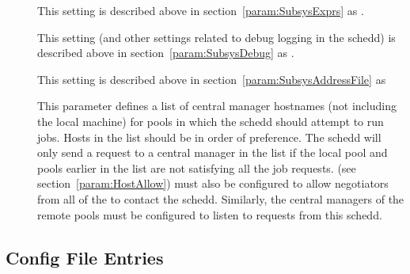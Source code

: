 \begin{description}
\item[] \label{param:ScheddExprs} This setting is
  described above in section~\ref{param:SubsysExprs} as
  .

\item[] \label{param:ScheddDebug} This setting
  (and other settings related to debug logging in the schedd) is
  described above in section~\ref{param:SubsysDebug} as
  .

\item[] \label{param:ScheddAddressFile}
  This setting is described above in
  section~\ref{param:SubsysAddressFile} as

\item[] \label{param:FlockHosts} This parameter
  defines a list of central manager hostnames (not including the local
   machine) for pools in which the schedd should
  attempt to run jobs.  Hosts in the list should be in order of
  preference.  The schedd will only send a request to a central
  manager in the list if the local pool and pools earlier in the list
  are not satisfying all the job requests.
   (see
  section~\ref{param:HostAllow}) must also be configured to allow
  negotiators from all of the  to contact the
  schedd.  Similarly, the central managers of the remote pools must be
  configured to listen to requests from this schedd.

\end{description}

\subsection{\label{sec:Shadow-Config-File-Entries}
 Config File Entries}


